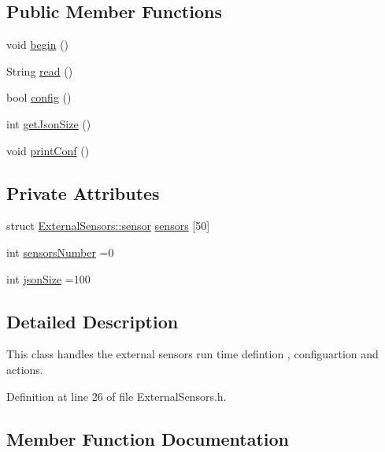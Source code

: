 \subsection*{Public Member Functions}
\begin{DoxyCompactItemize}
\item 
void \hyperlink{classExternalSensors_a58ede0d786a86417254708870f04a21e}{begin} ()
\item 
String \hyperlink{classExternalSensors_a53177b81eca3be89508b5511ddcd00fc}{read} ()
\item 
bool \hyperlink{classExternalSensors_a862a4bd11346b37270d0244c2adabe5a}{config} ()
\item 
int \hyperlink{classExternalSensors_a8e3a93efa8f5a0477f300e26084b6625}{get\+Json\+Size} ()
\item 
void \hyperlink{classExternalSensors_a78c2bf55084435dd51d3c559b2d3c6f3}{print\+Conf} ()
\end{DoxyCompactItemize}
\subsection*{Private Attributes}
\begin{DoxyCompactItemize}
\item 
struct \hyperlink{structExternalSensors_1_1sensor}{External\+Sensors\+::sensor} \hyperlink{classExternalSensors_a284233f884fcf00154a44740cf1d9e1e}{sensors} \mbox{[}50\mbox{]}
\item 
int \hyperlink{classExternalSensors_a58e4fbf9adeae787d92be5fa33043b5d}{sensors\+Number} =0
\item 
int \hyperlink{classExternalSensors_acacea86d74d967b57fcff282d26cff57}{json\+Size} =100
\end{DoxyCompactItemize}


\subsection{Detailed Description}
This class handles the external sensors run time defintion , configuartion and actions. 

Definition at line 26 of file External\+Sensors.\+h.



\subsection{Member Function Documentation}
\mbox{\label{classExternalSensors_a58ede0d786a86417254708870f04a21e}} 
